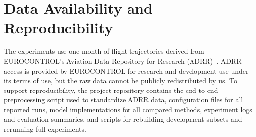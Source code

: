 \section*{Data Availability and Reproducibility}

The experiments use one month of flight trajectories derived from EUROCONTROL's Aviation Data Repository for Research (ADRR)~\cite{eurocontrol_adrr_2025}. ADRR access is provided by EUROCONTROL for research and development use under its terms of use, but the raw data cannot be publicly redistributed by us. To support reproducibility, the project repository contains the end-to-end preprocessing script used to standardize ADRR data, configuration files for all reported runs, model implementations for all compared methods, experiment logs and evaluation summaries, and scripts for rebuilding development subsets and rerunning full experiments.
